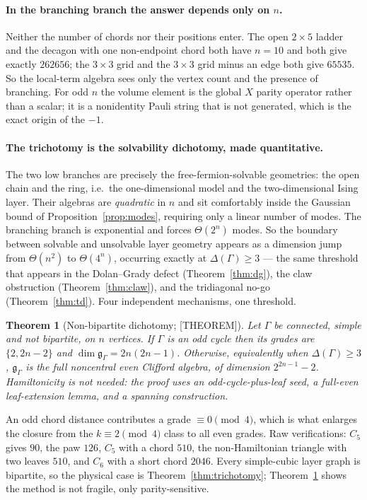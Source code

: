 \documentclass[11pt]{article}
\newtheorem{theorem}{Theorem}[section]
\theoremstyle{definition}
\newcommand{\alg}{\mathfrak{g}}
\begin{document}
\paragraph{In the branching branch the answer depends only on $n$.}
Neither the number of chords nor their positions enter. The open $2\times5$ ladder and the decagon
with one non-endpoint chord both have $n=10$ and both give exactly $262656$; the $3\times3$ grid and
the $3\times3$ grid minus an edge both give $65535$. So the local-term algebra sees only the vertex
count and the presence of branching. For odd $n$ the volume element is the global $X$ parity operator
rather than a scalar; it is a nonidentity Pauli string that is not generated, which is the exact
origin of the $-1$.

\paragraph{The trichotomy is the solvability dichotomy, made quantitative.}
The two low branches are precisely the free-fermion-solvable geometries: the open chain and the ring,
i.e.\ the one-dimensional model and the two-dimensional Ising layer. Their algebras are
\emph{quadratic} in $n$ and sit comfortably inside the Gaussian bound of
Proposition~\ref{prop:modes}, requiring only a linear number of modes. The branching branch is
exponential and forces $\Theta(2^n)$ modes. So the boundary between solvable and unsolvable layer
geometry appears as a dimension jump from $\Theta(n^2)$ to $\Theta(4^{n})$, occurring exactly at
$\Delta(\Gamma)\ge3$ --- the same threshold that appears in the Dolan--Grady defect
(Theorem~\ref{thm:dg}), the claw obstruction (Theorem~\ref{thm:claw}), and the tridiagonal no-go
(Theorem~\ref{thm:td}). Four independent mechanisms, one threshold.

\begin{theorem}[Non-bipartite dichotomy; {[THEOREM]}]\label{thm:nonbip}
Let $\Gamma$ be connected, simple and \emph{not} bipartite, on $n$ vertices. If $\Gamma$ is an odd
cycle then its grades are $\{2,2n-2\}$ and $\dim\alg_\Gamma=2n(2n-1)$. Otherwise, equivalently when
$\Delta(\Gamma)\ge3$, $\alg_\Gamma$ is the full noncentral even Clifford algebra, of dimension
$2^{2n-1}-2$. Hamiltonicity is not needed: the proof uses an odd-cycle-plus-leaf seed, a
full-even leaf-extension lemma, and a spanning construction.
\end{theorem}

An odd chord distance contributes a grade $\equiv0\pmod4$, which is what enlarges the closure from the
$k\equiv2\pmod4$ class to all even grades. Raw verifications: $C_5$ gives $90$, the paw $126$, $C_5$
with a chord $510$, the non-Hamiltonian triangle with two leaves $510$, and $C_6$ with a short chord
$2046$. Every simple-cubic layer graph is bipartite, so the physical case is
Theorem~\ref{thm:trichotomy}; Theorem~\ref{thm:nonbip} shows the method is not fragile, only
parity-sensitive.
\end{document}
